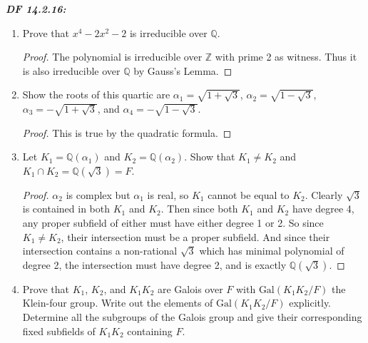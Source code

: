 \documentclass{article}
\begin{document}
\it \textbf{DF 14.2.16:}
  \begin{enumerate}[label={(\alph*)}]
    \item Prove that $x^4-2x^2-2$ is irreducible over $\mathbb{Q}$.
      \begin{proof}
        The polynomial is irreducible over $\mathbb{Z}$ with prime 2 as
        witness. Thus it is also irreducible over $\mathbb{Q}$ by Gauss's
        Lemma.
      \end{proof}

    \item Show the roots of this quartic are $\alpha_1=\sqrt{1+\sqrt{3}}$,
      $\alpha_2=\sqrt{1-\sqrt{3}}$, $\alpha_3=-\sqrt{1+\sqrt{3}}$, and
      $\alpha_4=-\sqrt{1-\sqrt{3}}$.

      \begin{proof}
        This is true by the quadratic formula.
      \end{proof}

    \item Let $K_1=\mathbb{Q}(\alpha_1)$ and $K_2=\mathbb{Q}(\alpha_2)$.
      Show that $K_1\neq K_2$ and $K_1\cap K_2=\mathbb{Q}(\sqrt{3})=F$.

      \begin{proof}
        $\alpha_2$ is complex but $\alpha_1$ is real, so $K_1$ cannot be
        equal to $K_2$. Clearly $\sqrt{3}$ is contained in both $K_1$ and
        $K_2$. Then since both $K_1$ and $K_2$ have degree 4, any proper
        subfield of either must have either degree 1 or 2. So since
        $K_1\neq K_2$, their intersection must be a proper subfield. And
        since their intersection contains a non-rational $\sqrt{3}$ which
        has minimal polynomial of degree 2, the intersection
        must have degree 2, and is exactly $\mathbb{Q}(\sqrt{3})$.
      \end{proof}

    \item Prove that $K_1$, $K_2$, and $K_1K_2$ are Galois over $F$ with
      $\text{Gal}(K_1K_2/F)$ the Klein-four group. Write out the elements
      of $\text{Gal}(K_1K_2/F)$ explicitly. Determine all the subgroups of
      the Galois group and give their corresponding fixed subfields of
      $K_1K_2$ containing $F$.


\end{enumerate}
\end{document}

